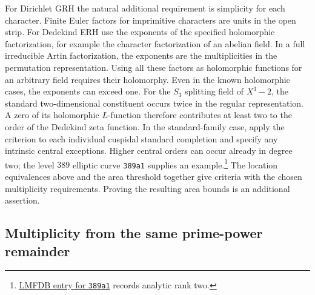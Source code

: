 \documentclass[11pt]{amsart}
\theoremstyle{definition}
\theoremstyle{remark}
\numberwithin{equation}{section}
\begin{document}
For Dirichlet GRH the natural additional requirement is simplicity
for each character. Finite Euler factors for imprimitive characters
are units in the open strip. For Dedekind ERH use the exponents of the
specified holomorphic factorization, for example the character
factorization of an abelian field. In a full irreducible Artin
factorization, the exponents are the multiplicities in the permutation
representation. Using all these factors as holomorphic functions for
an arbitrary field requires their holomorphy. Even in the known
holomorphic cases, the exponents can exceed one. For the \(S_3\)
splitting field of \(X^3-2\), the standard two-dimensional constituent
occurs twice in the regular representation. A zero of its holomorphic
\(L\)-function therefore contributes at least two to the order of the
Dedekind zeta function. In the standard-family case, apply the criterion to each
individual cuspidal standard completion and specify any intrinsic
central exceptions. Higher central orders can occur already in degree
two; the level \(389\) elliptic curve \texttt{389a1} supplies an
example.\footnote{\href{https://www.lmfdb.org/EllipticCurve/Q/389a1/}
{LMFDB entry for \texttt{389a1}} records analytic rank two.}
The location equivalences above and the area threshold together give
criteria with the chosen multiplicity requirements. Proving the
resulting area bounds is an additional assertion.

\subsection{Multiplicity from the same prime-power remainder}
\end{document}
